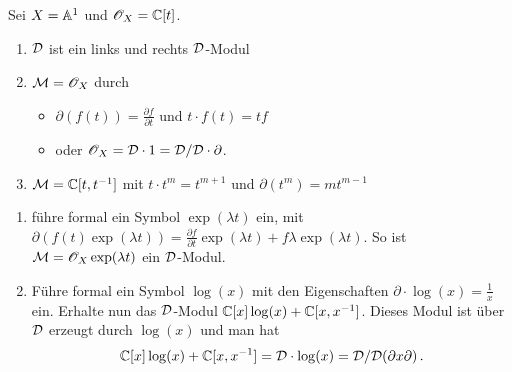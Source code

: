 \begin{exmp}
\cite[Exmp 2.2]{ArkhipovDmod}
Sei $X=\mathbb{A}^1$ und $\mathscr{O}_X=\mathbb{C}[t]$.
\begin{enumerate}
\item $\mathcal{D}$ ist ein links und rechts $\mathcal{D}$-Modul
\item $\mathcal{M}=\mathscr{O}_X$ durch
\begin{itemize}
\item $\partial(f(t))=\frac{\partial f}{\partial t}$ und
$t\cdot f(t)=tf$
\item oder \cite[Exmp 3.1.2]{ginzburg} $\mathscr{O}_X=\mathcal{D}\cdot1=\mathcal{D}/\mathcal{D}\cdot\partial$.
\end{itemize}
\item $\mathcal{M}=\mathbb{C}[t,t^{-1}]$ mit $t\cdot t^{m}=t^{m+1}$ und
$\partial(t^m)=mt^{m-1}$
\end{enumerate}
\end{exmp}
\begin{exmp} 
\begin{enumerate}
\item \cite[Exmp 2.2]{ArkhipovDmod}
führe formal ein Symbol $\exp(\lambda t)$ ein, mit
$\partial(f(t)\exp(\lambda t))=\frac{\partial f}{\partial t}\exp(\lambda
t)+f\lambda\exp(\lambda t)$.  So ist $\mathcal{M}=\mathscr{O}_X\exp(\lambda t)$ ein
$\mathcal{D}$-Modul.
\item \cite[Exmp 3.1.4]{ginzburg}
Führe formal ein Symbol $\log(x)$ mit den Eigenschaften
$\partial\cdot\log(x)=\frac{1}{x}$ ein. Erhalte nun das $\mathcal{D}$-Modul
$\mathbb{C}[x]\log(x)+\mathbb{C}[x,x^{-1}]$. Dieses Modul ist über $\mathcal{D}$ erzeugt durch
$\log(x)$ und man hat
\[
\mathbb{C}[x]\log(x)+\mathbb{C}[x,x^{-1}]=\mathcal{D}\cdot\log(x)=\mathcal{D}\slash\mathcal{D}(\partial x\partial) \,.
\]
\end{enumerate}
\end{exmp}

\begin{comment}
\section{Lokalisierung von $\Ckx$-Moduln}
\cite[Chap 4.1.]{sabbah_cimpa90}
Sei $M$ ein $\Ckx$-Modul. Wir schreiben $M[x^{-1}]$ für den $K$-Vektor Raum
$M\otimes_{\Ckx}K$. Im allgemeinen gilt, falls $M$ von andlichen Typ über
$\Ckx$ ist, so ist $C[x^{-1}]$ von endlichem Typ über $K$. Bemerke aber, dass
$M[x^{-1}]$ generell nicht von endlichem Typ über $\Ckx$ ist.
\end{comment}


